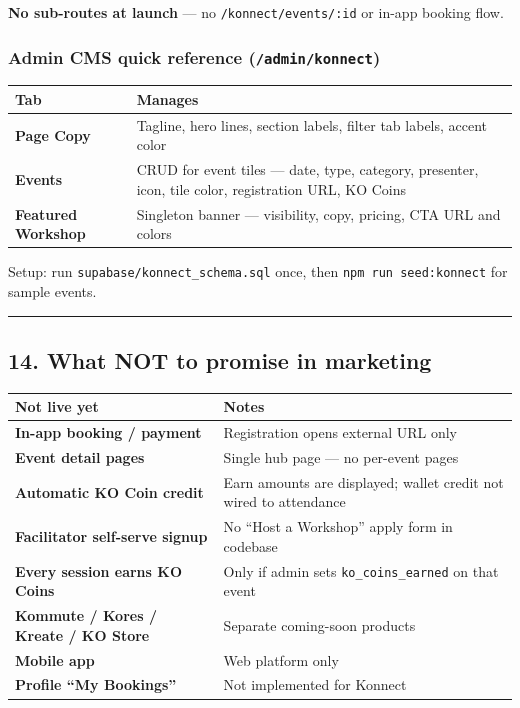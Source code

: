 \documentclass[11pt,a4paper]{report}
\begin{document}
\textbf{No sub-routes at launch} --- no \texttt{/konnect/events/:id} or in-app booking flow.


\subsubsection{Admin CMS quick reference (\texttt{/admin/konnect})}

\begin{longtable}{|l|l|}
\hline
Tab & Manages \\ \hline
\textbf{Page Copy} & Tagline, hero lines, section labels, filter tab labels, accent color \\ \hline
\textbf{Events} & CRUD for event tiles --- date, type, category, presenter, icon, tile color, registration URL, KO Coins \\ \hline
\textbf{Featured Workshop} & Singleton banner --- visibility, copy, pricing, CTA URL and colors \\
\hline
\end{longtable}


Setup: run \texttt{supabase/konnect\_schema.sql} once, then \texttt{npm run seed:konnect} for sample events.


\medskip\hrule\medskip

\subsection{14. What NOT to promise in marketing}

\begin{longtable}{|l|l|}
\hline
Not live yet & Notes \\ \hline
\textbf{In-app booking / payment} & Registration opens external URL only \\ \hline
\textbf{Event detail pages} & Single hub page --- no per-event pages \\ \hline
\textbf{Automatic KO Coin credit} & Earn amounts are displayed; wallet credit not wired to attendance \\ \hline
\textbf{Facilitator self-serve signup} & No “Host a Workshop” apply form in codebase \\ \hline
\textbf{Every session earns KO Coins} & Only if admin sets \texttt{ko\_coins\_earned} on that event \\ \hline
\textbf{Kommute / Kores / Kreate / KO Store} & Separate coming-soon products \\ \hline
\textbf{Mobile app} & Web platform only \\ \hline
\textbf{Profile “My Bookings”} & Not implemented for Konnect \\
\hline
\end{longtable}
\end{document}
